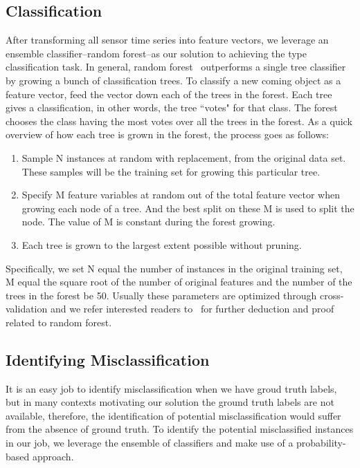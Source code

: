 \subsection{Classification}
After transforming all sensor time series into feature vectors, we leverage an ensemble classifier--random forest--as our solution to achieving the type classification task. In general, random forest~\cite{RF} outperforms a single tree classifier by growing a bunch of classification trees. To classify a new coming object as a feature vector, feed the vector down each of the trees in the forest. Each tree gives a classification, in other words, the tree ``votes" for that class. The forest chooses the class having the most votes over all the trees in the forest. As a quick overview of how each tree is grown in the forest, the process goes as follows:
\begin{enumerate}
\item Sample N instances at random with replacement, from the original data set. These samples will be the training set for growing this particular tree.
\item Specify M feature variables at random out of the total feature vector when growing each node of a tree. And the best split on these M is used to split the node. The value of M is constant during the forest growing.
\item Each tree is grown to the largest extent possible without pruning.
\end{enumerate}
Specifically, we set N equal the number of instances in the original training set, M equal the square root of the number of original features and the number of the trees in the forest be 50. Usually these parameters are optimized through cross-validation and we refer interested readers to~\cite{RF} for further deduction and proof related to random forest.


\subsection{Identifying Misclassification}
It is an easy job to identify misclassification when we have groud truth labels, but in many contexts motivating our solution the ground truth labels are not available, therefore, the identification of potential misclassification would suffer from the absence of ground truth. To identify the potential misclassified instances in our job, we leverage the ensemble of classifiers and make use of a probability-based approach.
